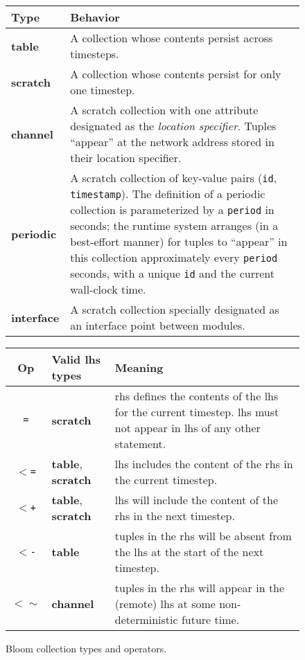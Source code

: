 \begin{figure}
	\begin{small}
	\begin{tabular}{|l|p{2.55in}|}
		\hline
		Type & Behavior\\
		\hline
		\textbf{table} & A collection whose contents persist across timesteps.\\
		\textbf{scratch} & A collection whose contents persist for only one timestep.\\
		\textbf{channel} & A scratch collection with one attribute designated as
        the {\em location specifier}. Tuples ``appear'' at the network address stored in their location specifier.\\
		\textbf{periodic} & A scratch collection of key-value pairs (\texttt{id}, \texttt{timestamp}).  The definition of a periodic collection is parameterized by a \texttt{period} in seconds; the runtime system arranges (in a best-effort manner) for tuples to ``appear'' in this collection approximately every \texttt{period} seconds, with a unique \texttt{id} and the current wall-clock time.\\
    \textbf{interface} & A scratch collection specially designated as an interface point between modules.\\
		\hline
	\end{tabular}

	\vspace{1.6em}
	\begin{tabular}{|c|l|p{2.035in}|}
		\hline
		Op & Valid lhs types & Meaning\\
				\hline 
		\texttt{=} & \textbf{scratch} & rhs defines the contents of the lhs for the current timestep.  lhs must not appear in lhs of any other statement.\\
		\texttt{$<$=} & \textbf{table}, \textbf{scratch} & lhs includes the content of the rhs in the current timestep.\\
		\texttt{$<$+} & \textbf{table}, \textbf{scratch} & lhs will include the content of the rhs in the next timestep.\\
		\texttt{$<$-} & \textbf{table} & tuples in the rhs will be absent from the lhs at the start of  the next timestep.\\
		\texttt{$<\sim$} & \textbf{channel} & tuples in the rhs will appear in the (remote) lhs at some non-deterministic future time.\\
		\hline
	\end{tabular}
	\end{small}
	\caption{Bloom collection types and operators.}
	\label{tab:bloom}
\end{figure}


